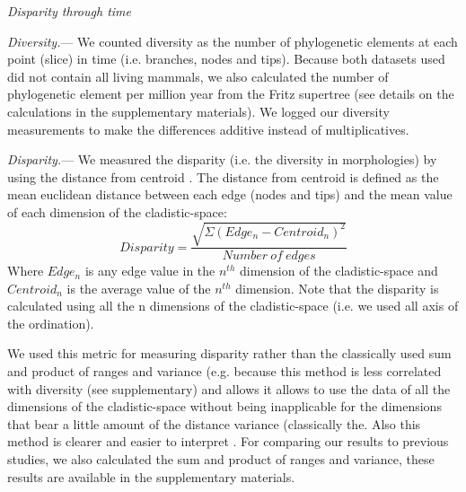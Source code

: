 \documentclass[12pt,letterpaper]{article}
\renewcommand{\subsection}[1]{%
\bigskip
\begin{center}
\begin{large}
\normalfont\itshape #1
\end{large}
\end{center}}
\renewcommand{\subsubsection}[1]{%
\vspace{2ex}
\noindent
\textit{#1.}---}
\begin{document}
\subsection{Disparity through time}
\subsubsection{Diversity}
We counted diversity as the number of phylogenetic elements at each point (slice) in time (i.e. branches, nodes and tips). Because both datasets used did not contain all living mammals, we also calculated the number of phylogenetic element per million year from the Fritz supertree \cite{fritzdiversity2013} (see details on the calculations in the supplementary materials). We logged our diversity measurements to make the differences additive instead of multiplicatives.

\subsubsection{Disparity}
We measured the disparity (i.e. the diversity in morphologies) by using the distance from centroid \cite{finlay2015morphological}. The distance from centroid is defined as the mean euclidean distance between each edge (nodes and tips) and the mean value of each dimension of the cladistic-space:
\begin{equation}
Disparity=\frac{\sqrt{\Sigma(Edge_{n}-Centroid_{n})^2}}{Number\ of\ edges}
\end{equation}
Where $Edge_{n}$ is any edge value in the $n^{th}$ dimension of the cladistic-space and $Centroid_{n}$ is the average value of the $n^{th}$ dimension. Note that the disparity is calculated using all the n dimensions of the cladistic-space (i.e. we used all axis of the ordination).

We used this metric for measuring disparity rather than the classically used sum and product of ranges and variance (e.g. \cite{Wills1994,Foote29111996,Wesley-Hunt2005,Brusatte12092008,ruta2013} %
because this method is less correlated with diversity (see supplementary) and allows it allows to use the data of all the dimensions of the cladistic-space without being inapplicable for the dimensions that bear a little amount of the distance variance (classically the. Also this method is clearer and easier to interpret \cite{finlay2015morphological}. For comparing our results to previous studies, we also calculated the sum and product of ranges and variance, these results are available in the supplementary materials.
\end{document}

